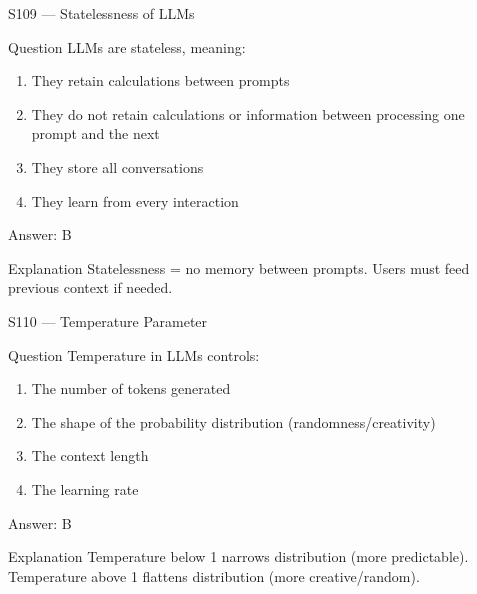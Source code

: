 \documentclass[aspectratio=169,8pt]{beamer}
\begin{document}
	\begin{frame}{S109 --- Statelessness of LLMs}
		\begin{block}{Question}
			LLMs are stateless, meaning:
			\begin{enumerate}
				\item They retain calculations between prompts
				\item They do not retain calculations or information between processing one prompt and the next
				\item They store all conversations
				\item They learn from every interaction
			\end{enumerate}
		\end{block}
		\begin{exampleblock}{Answer: B}\end{exampleblock}
		\begin{block}{Explanation}
			Statelessness = no memory between prompts. Users must feed previous context if needed.
		\end{block}
	\end{frame}
	
	\begin{frame}{S110 --- Temperature Parameter}
		\begin{block}{Question}
			Temperature in LLMs controls:
			\begin{enumerate}
				\item The number of tokens generated
				\item The shape of the probability distribution (randomness/creativity)
				\item The context length
				\item The learning rate
			\end{enumerate}
		\end{block}
		\begin{exampleblock}{Answer: B}\end{exampleblock}
		\begin{block}{Explanation}
			Temperature below 1 narrows distribution (more predictable). Temperature above 1 flattens distribution (more creative/random).
		\end{block}
	\end{frame}
	
\end{document}

